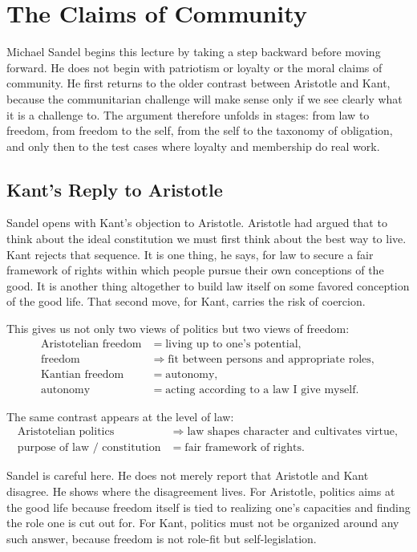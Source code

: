 \chapter{The Claims of Community}

Michael Sandel begins this lecture by taking a step backward before moving forward. He does not begin with patriotism or loyalty or the moral claims of community. He first returns to the older contrast between Aristotle and Kant, because the communitarian challenge will make sense only if we see clearly what it is a challenge to. The argument therefore unfolds in stages: from law to freedom, from freedom to the self, from the self to the taxonomy of obligation, and only then to the test cases where loyalty and membership do real work.

\section{Kant's Reply to Aristotle}

Sandel opens with Kant's objection to Aristotle. Aristotle had argued that to think about the ideal constitution we must first think about the best way to live. Kant rejects that sequence. It is one thing, he says, for law to secure a fair framework of rights within which people pursue their own conceptions of the good. It is another thing altogether to build law itself on some favored conception of the good life. That second move, for Kant, carries the risk of coercion.

This gives us not only two views of politics but two views of freedom:
\begin{align}
\text{Aristotelian freedom} &= \text{living up to one's potential}, \\
\text{freedom} &\Longrightarrow \text{fit between persons and appropriate roles}, \\
\text{Kantian freedom} &= \text{autonomy}, \\
\text{autonomy} &= \text{acting according to a law I give myself}.
\end{align}

The same contrast appears at the level of law:
\begin{align}
\text{Aristotelian politics} &\Longrightarrow \text{law shapes character and cultivates virtue}, \\
\text{purpose of law / constitution} &= \text{fair framework of rights}.
\end{align}

Sandel is careful here. He does not merely report that Aristotle and Kant disagree. He shows where the disagreement lives. For Aristotle, politics aims at the good life because freedom itself is tied to realizing one's capacities and finding the role one is cut out for. For Kant, politics must not be organized around any such answer, because freedom is not role-fit but self-legislation.

